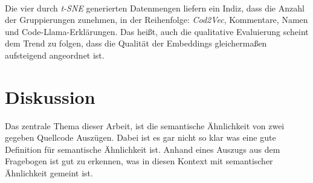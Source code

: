 \documentclass[12pt,letterpaper,ngerman]{article}
\begin{document}
\pagebreak\\
Die vier durch \textit{t-SNE} generierten Datenmengen liefern ein Indiz,
dass die Anzahl der Gruppierungen zunehmen, in der Reihenfolge: 
\textit{Cod2Vec}, Kommentare, Namen und Code-Llama-Erklärungen.
Das heißt, auch die qualitative Evaluierung scheint dem Trend zu 
folgen, dass die Qualität der Embeddings gleichermaßen aufsteigend
angeordnet ist.\\
\section{Diskussion}
Das zentrale Thema dieser Arbeit, ist die semantische Ähnlichkeit
von zwei gegeben Quellcode Auszügen. Dabei ist es gar nicht so klar 
was eine gute Definition für semantische Ähnlichkeit ist.
Anhand eines Auszugs aus dem Fragebogen ist gut zu erkennen,
was in diesen Kontext mit semantischer Ähnlichkeit gemeint ist.
\end{document}
